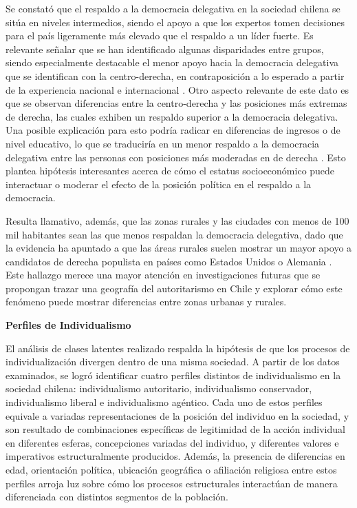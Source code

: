 \documentclass[12pt,twoside]{templates/facsothesis}
\begin{document}
Se constató que el respaldo a la democracia delegativa en la sociedad chilena se sitúa en niveles intermedios, siendo el apoyo a que los expertos tomen decisiones para el país ligeramente más elevado que el respaldo a un líder fuerte. Es relevante señalar que se han identificado algunas disparidades entre grupos, siendo especialmente destacable el menor apoyo hacia la democracia delegativa que se identifican con la centro-derecha, en contraposición a lo esperado a partir de la experiencia nacional \citep{navia2019} e internacional \citep{donovan2021}. Otro aspecto relevante de este dato es que se observan diferencias entre la centro-derecha y las posiciones más extremas de derecha, las cuales exhiben un respaldo superior a la democracia delegativa. Una posible explicación para esto podría radicar en diferencias de ingresos o de nivel educativo, lo que se traduciría en un menor respaldo a la democracia delegativa entre las personas con posiciones más moderadas en de derecha \citep{kang2018}. Esto plantea hipótesis interesantes acerca de cómo el estatus socioeconómico puede interactuar o moderar el efecto de la posición política en el respaldo a la democracia.

Resulta llamativo, además, que las zonas rurales y las ciudades con menos de 100 mil habitantes sean las que menos respaldan la democracia delegativa, dado que la evidencia ha apuntado a que las áreas rurales suelen mostrar un mayor apoyo a candidatos de derecha populista en países como Estados Unidos \citep{schafft2021} o Alemania \citep{deppisch2022}. Este hallazgo merece una mayor atención en investigaciones futuras que se propongan trazar una geografía del autoritarismo en Chile y explorar cómo este fenómeno puede mostrar diferencias entre zonas urbanas y rurales.

\textbf{Perfiles de Individualismo}

El análisis de clases latentes realizado respalda la hipótesis de que los procesos de individualización divergen dentro de una misma sociedad. A partir de los datos examinados, se logró identificar cuatro perfiles distintos de individualismo en la sociedad chilena: individualismo autoritario, individualismo conservador, individualismo liberal e individualismo agéntico. Cada uno de estos perfiles equivale a variadas representaciones de la posición del individuo en la sociedad, y son resultado de combinaciones específicas de legitimidad de la acción individual en diferentes esferas, concepciones variadas del individuo, y diferentes valores e imperativos estructuralmente producidos. Además, la presencia de diferencias en edad, orientación política, ubicación geográfica o afiliación religiosa entre estos perfiles arroja luz sobre cómo los procesos estructurales interactúan de manera diferenciada con distintos segmentos de la población.
\end{document}
